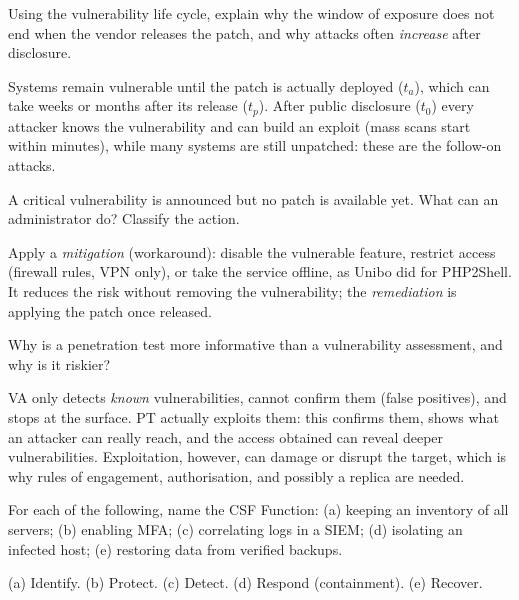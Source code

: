 \begin{exercise}
Using the vulnerability life cycle, explain why the window of exposure does not end when the vendor releases the patch, and why attacks often \emph{increase} after disclosure.
\end{exercise}
\begin{solution}
Systems remain vulnerable until the patch is actually deployed ($t_a$), which can take weeks or months after its release ($t_p$). After public disclosure ($t_0$) every attacker knows the vulnerability and can build an exploit (mass scans start within minutes), while many systems are still unpatched: these are the follow-on attacks.
\end{solution}

\begin{exercise}
A critical vulnerability is announced but no patch is available yet. What can an administrator do? Classify the action.
\end{exercise}
\begin{solution}
Apply a \emph{mitigation} (workaround): disable the vulnerable feature, restrict access (firewall rules, VPN only), or take the service offline, as Unibo did for PHP2Shell. It reduces the risk without removing the vulnerability; the \emph{remediation} is applying the patch once released.
\end{solution}

\begin{exercise}
Why is a penetration test more informative than a vulnerability assessment, and why is it riskier?
\end{exercise}
\begin{solution}
VA only detects \emph{known} vulnerabilities, cannot confirm them (false positives), and stops at the surface. PT actually exploits them: this confirms them, shows what an attacker can really reach, and the access obtained can reveal deeper vulnerabilities. Exploitation, however, can damage or disrupt the target, which is why rules of engagement, authorisation, and possibly a replica are needed.
\end{solution}

\begin{exercise}
For each of the following, name the CSF Function: (a) keeping an inventory of all servers; (b) enabling MFA; (c) correlating logs in a SIEM; (d) isolating an infected host; (e) restoring data from verified backups.
\end{exercise}
\begin{solution}
(a) Identify. (b) Protect. (c) Detect. (d) Respond (containment). (e) Recover.
\end{solution}

